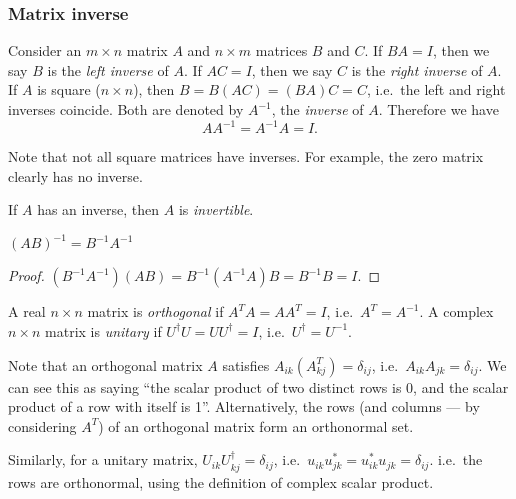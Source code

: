 \documentclass[a4paper]{article}
\begin{document}
\subsubsection{Matrix inverse}

\begin{defi}
  Consider an $m\times n$ matrix $A$ and $n\times m$ matrices $B$ and $C$. If $BA = I$, then we say $B$ is the \emph{left inverse} of $A$. If $AC = I$, then we say $C$ is the \emph{right inverse} of $A$. If $A$ is square ($n\times n$), then $B = B(AC) = (BA)C = C$, i.e.\ the left and right inverses coincide. Both are denoted by $A^{-1}$, the \emph{inverse} of $A$. Therefore we have
  \[
    AA^{-1} = A^{-1}A = I.
  \]
\end{defi}
Note that not all square matrices have inverses. For example, the zero matrix clearly has no inverse.

\begin{defi}
  If $A$ has an inverse, then $A$ is \emph{invertible}.
\end{defi}

\begin{prop}
  $(AB)^{-1} = B^{-1}A^{-1}$
\end{prop}

\begin{proof}
  $(B^{-1}A^{-1})(AB) = B^{-1}(A^{-1}A)B = B^{-1}B = I$.
\end{proof}

\begin{defi}
  A real $n\times n$ matrix is \emph{orthogonal} if $A^TA = AA^T = I$, i.e.\ $A^T = A^{-1}$. A complex $n\times n$ matrix is \emph{unitary} if $U^\dagger U = UU^\dagger = I$, i.e.\ $U^\dagger = U^{-1}$.
\end{defi}
Note that an orthogonal matrix $A$ satisfies $A_{ik}(A^T_{kj}) = \delta_{ij}$, i.e.\ $A_{ik}A_{jk} = \delta_{ij}$. We can see this as saying ``the scalar product of two distinct rows is 0, and the scalar product of a row with itself is 1''. Alternatively, the rows (and columns --- by considering $A^T$) of an orthogonal matrix form an orthonormal set.

Similarly, for a unitary matrix, $U_{ik}U_{kj}^\dagger = \delta_{ij}$, i.e.\ $u_{ik}u_{jk}^* = u_{ik}^*u_{jk} =\delta_{ij}$. i.e.\ the rows are orthonormal, using the definition of complex scalar product.
\end{document}
